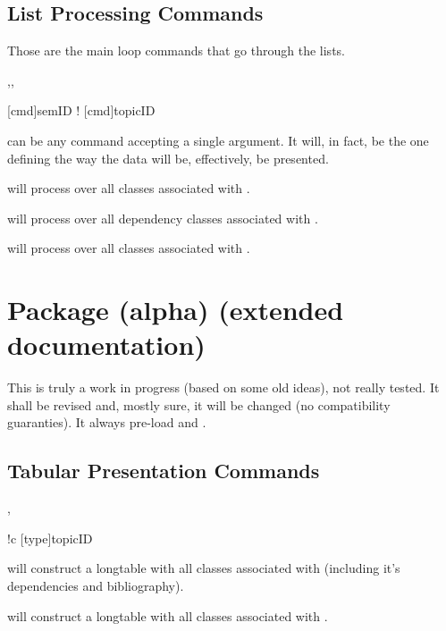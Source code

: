 \documentclass[dctools,english]{ufrgscca} %
\begin{document}
\subsection{List Processing Commands}
Those are the main loop commands that go through the lists.
\begin{Macros}{\LstClass,\LstDep,\LstTopic}
    \begin{Syntax}
        \Macro{\LstClass}[cmd]{semID}
        \Macro!{\LstDep}{}
        \Macro{\LstTopic}[cmd]{topicID}
    \end{Syntax}
 can be any command accepting a single argument. It will, in fact, be the one defining the way the data will be, effectively, be presented.

\Macro{\LstClass}{} will process  over all classes associated with .

\Macro{\LstDep}{} will process  over all dependency classes associated with .

\Macro{\LstTopic}{} will process  over all classes associated with .

\end{Macros}

\section{ Package (alpha) (extended documentation)}
This is truly a work in progress (based on some old ideas), not really tested. It shall be revised and, mostly sure, it will be changed (no compatibility guaranties).  It always pre-load  and .

\subsection{Tabular Presentation Commands}
\begin{Macros}{\TabEtp,\TabTopic}
    \begin{Syntax}%
        \Macro!{\TabEtp}{c}
        \Macro{\TabTopic}[type]{topicID}
    \end{Syntax}
\Macro{\TabEtp}{} will construct a longtable with all classes associated with  (including it's dependencies and bibliography).

\Macro{\TabTopic}{} will construct a longtable with all classes associated with .

\end{Macros}
\end{document}
